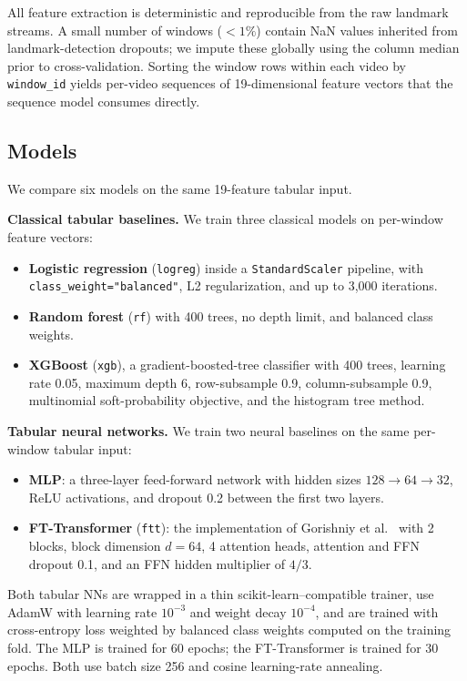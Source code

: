 \documentclass{article}
\begin{document}
All feature extraction is deterministic and reproducible from the raw landmark streams. A small number of windows ($<1\%$) contain NaN values inherited from landmark-detection dropouts; we impute these globally using the column median prior to cross-validation. Sorting the window rows within each video by \texttt{window\_id} yields per-video sequences of 19-dimensional feature vectors that the sequence model consumes directly.

\subsection{Models}

We compare six models on the same 19-feature tabular input.

\textbf{Classical tabular baselines.} We train three classical models on per-window feature vectors:

\begin{itemize}
    \item \textbf{Logistic regression} (\texttt{logreg}) inside a \texttt{StandardScaler} pipeline, with \texttt{class\_weight="balanced"}, L2 regularization, and up to 3,000 iterations.
    \item \textbf{Random forest} (\texttt{rf}) with 400 trees, no depth limit, and balanced class weights.
    \item \textbf{XGBoost} (\texttt{xgb}), a gradient-boosted-tree classifier with 400 trees, learning rate 0.05, maximum depth 6, row-subsample 0.9, column-subsample 0.9, multinomial soft-probability objective, and the histogram tree method.
\end{itemize}

\textbf{Tabular neural networks.} We train two neural baselines on the same per-window tabular input:

\begin{itemize}
    \item \textbf{MLP}: a three-layer feed-forward network with hidden sizes $128 \to 64 \to 32$, ReLU activations, and dropout 0.2 between the first two layers.
    \item \textbf{FT-Transformer} (\texttt{ftt}): the implementation of Gorishniy et al.\ \cite{gorishniy2021rtdl} with 2 blocks, block dimension $d = 64$, 4 attention heads, attention and FFN dropout 0.1, and an FFN hidden multiplier of $4/3$.
\end{itemize}

Both tabular NNs are wrapped in a thin scikit-learn--compatible trainer, use AdamW \cite{loshchilov2019adamw} with learning rate $10^{-3}$ and weight decay $10^{-4}$, and are trained with cross-entropy loss weighted by balanced class weights computed on the training fold. The MLP is trained for 60 epochs; the FT-Transformer is trained for 30 epochs. Both use batch size 256 and cosine learning-rate annealing.
\end{document}

